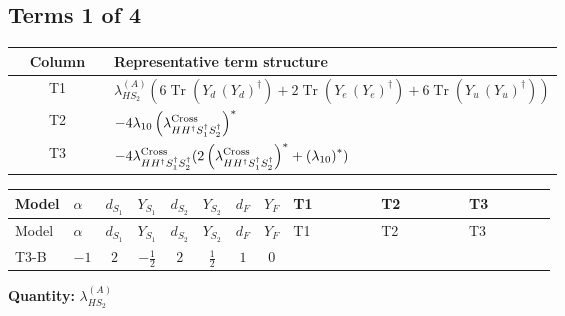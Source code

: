 \documentclass[8pt]{article}
\begin{document}
\begin{landscape}
\subsection*{Terms 1 of 4}
\begin{center}
\begin{tabular}{@{}c >{\raggedright\arraybackslash}p{0.82\linewidth}@{}}
\toprule
Column & Representative term structure \\
\midrule
T1 & \(\displaystyle {\lambda_{HS_2}^{(A)}} (6 \operatorname{Tr}\!\left({Y_d}\,\left({Y_d}\right)^{\dagger}\right)+2 \operatorname{Tr}\!\left({Y_e}\,\left({Y_e}\right)^{\dagger}\right)+6 \operatorname{Tr}\!\left({Y_u}\,\left({Y_u}\right)^{\dagger}\right))\) \\
\midrule
T2 & \(\displaystyle -4 {\lambda_{10}} \left({\lambda_{H H^\dagger S_1^\dagger S_2^\dagger}^{\rm Cross}}\right)^{*}\) \\
\midrule
T3 & \(\displaystyle -4 {\lambda_{H H^\dagger S_1^\dagger S_2^\dagger}^{\rm Cross}} (2 \left({\lambda_{H H^\dagger S_1^\dagger S_2^\dagger}^{\rm Cross}}\right)^{*}+\left({\lambda_{10}}\right)^{*})\) \\
\midrule
\bottomrule
\end{tabular}
\end{center}
\smallskip
\tiny
\begin{longtable}{@{}llcccccc >{\raggedright\arraybackslash}p{0.21\linewidth} >{\raggedright\arraybackslash}p{0.21\linewidth} >{\raggedright\arraybackslash}p{0.21\linewidth}@{}}
\toprule
Model & $\alpha$ & $d_{S_1}$ & $Y_{S_1}$ & $d_{S_2}$ & $Y_{S_2}$ & $d_F$ & $Y_F$ & T1 & T2 & T3 \\
\midrule
\endfirsthead
\toprule
Model & $\alpha$ & $d_{S_1}$ & $Y_{S_1}$ & $d_{S_2}$ & $Y_{S_2}$ & $d_F$ & $Y_F$ & T1 & T2 & T3 \\
\midrule
\endhead
T3-B & $-1$ & $2$ & $-\frac{1}{2}$ & $2$ & $\frac{1}{2}$ & $1$ & $0$ & \scriptsize\adjustbox{max width=\linewidth}{$\begin{gathered} {\lambda_{HS_2}^{(A)}} (6 \operatorname{Tr}\!\left({Y_d}\,\left({Y_d}\right)^{\dagger}\right)+2 \operatorname{Tr}\!\left({Y_e}\,\left({Y_e}\right)^{\dagger}\right)+6 \operatorname{Tr}\!\left({Y_u}\,\left({Y_u}\right)^{\dagger}\right))\end{gathered}$} & \scriptsize\adjustbox{max width=\linewidth}{$\begin{gathered} -4 {\lambda_{10}} \left({\lambda_{H H^\dagger S_1^\dagger S_2^\dagger}^{\rm Cross}}\right)^{*}\end{gathered}$} & \scriptsize\adjustbox{max width=\linewidth}{$\begin{gathered} -4 {\lambda_{H H^\dagger S_1^\dagger S_2^\dagger}^{\rm Cross}} (2 \left({\lambda_{H H^\dagger S_1^\dagger S_2^\dagger}^{\rm Cross}}\right)^{*}+\left({\lambda_{10}}\right)^{*})\end{gathered}$} \\
\midrule
\bottomrule
\end{longtable}
\clearpage
\noindent\textbf{Quantity: }$\lambda_{HS_2}^{(A)}$\par\smallskip

\end{landscape}
\end{document}
